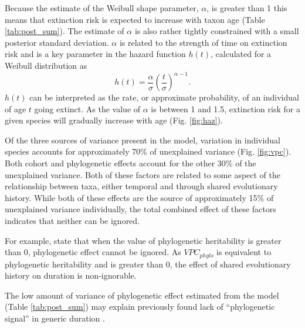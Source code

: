 \documentclass[12pt,letterpaper]{article}
\begin{document}
Because the estimate of the Weibull shape parameter, \(\alpha\), is greater than 1 this means that extinction risk is expected to increase with taxon age (Table \ref{tab:post_sum}). The estimate of \(\alpha\) is also rather tightly constrained with a small posterior standard deviation. \(\alpha\) is related to the strength of time on extinction risk and is a key parameter in the hazard function \(h(t)\), calculated for a Weibull distribution as
\begin{equation}
  h(t) = \frac{\alpha}{\sigma}\left(\frac{t}{\sigma}\right)^{\alpha - 1}.
\end{equation}
\(h(t)\) can be interpreted as the rate, or approximate probability, of an individual of age \(t\) going extinct. As the value of \(\alpha\) is between 1 and 1.5, extinction risk for a given species will gradually increase with age (Fig. \ref{fig:haz}). 

Of the three sources of variance present in the model, variation in individual species accounts for approximately 70\% of unexplained variance (Fig. \ref{fig:vpc}). Both cohort and phylogenetic effects account for the other 30\% of the unexplained variance. Both of these factors are related to some aspect of the relationship between taxa, either temporal and through shared evolutionary history. While both of these effects are the source of approximately 15\% of unexplained variance individually, the total combined effect of these factors indicates that neither can be ignored. 

For example, \citet{Housworth2004} state that when the value of phylogenetic heritability is greater than 0, phylogenetic effect cannot be ignored. As \(VPC_{phylo}\) is equivalent to phylogenetic heritability and is greater than 0, the effect of shared evolutionary history on duration is non-ignorable.

The low amount of variance of phylogenetic effect estimated from the model (Table \ref{tab:post_sum}) may explain previously found lack of ``phylogenetic signal'' in generic duration \citep{Tomiya2013}.



\end{document}
